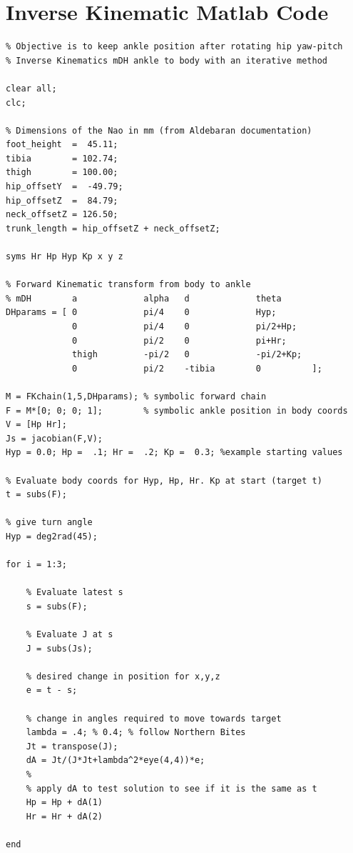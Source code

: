 \documentclass[pdftex,11pt,a4paper]{report}
\begin{document}
\newpage
\section{Inverse Kinematic Matlab Code} \label{appendixIKMatlab}
\lstset{language=Matlab}
\begin{lstlisting}
% Objective is to keep ankle position after rotating hip yaw-pitch
% Inverse Kinematics mDH ankle to body with an iterative method

clear all;
clc;

% Dimensions of the Nao in mm (from Aldebaran documentation)
foot_height  =  45.11;
tibia        = 102.74;
thigh        = 100.00;
hip_offsetY  =  -49.79;
hip_offsetZ  =  84.79;
neck_offsetZ = 126.50;
trunk_length = hip_offsetZ + neck_offsetZ;

syms Hr Hp Hyp Kp x y z 

% Forward Kinematic transform from body to ankle 
% mDH        a             alpha   d             theta
DHparams = [ 0             pi/4    0             Hyp;
             0             pi/4    0             pi/2+Hp;
             0             pi/2    0             pi+Hr;
             thigh         -pi/2   0             -pi/2+Kp;
             0             pi/2    -tibia        0          ];

M = FKchain(1,5,DHparams); % symbolic forward chain
F = M*[0; 0; 0; 1];        % symbolic ankle position in body coords
V = [Hp Hr];
Js = jacobian(F,V);
Hyp = 0.0; Hp =  .1; Hr =  .2; Kp =  0.3; %example starting values

% Evaluate body coords for Hyp, Hp, Hr. Kp at start (target t)
t = subs(F);

% give turn angle 
Hyp = deg2rad(45);

for i = 1:3; 

    % Evaluate latest s 
    s = subs(F);
    
    % Evaluate J at s
    J = subs(Js);      

    % desired change in position for x,y,z
    e = t - s;

    % change in angles required to move towards target
    lambda = .4; % 0.4; % follow Northern Bites
    Jt = transpose(J);
    dA = Jt/(J*Jt+lambda^2*eye(4,4))*e;
    % 
    % apply dA to test solution to see if it is the same as t
    Hp = Hp + dA(1)
    Hr = Hr + dA(2)

end
\end{lstlisting}
\end{document}
